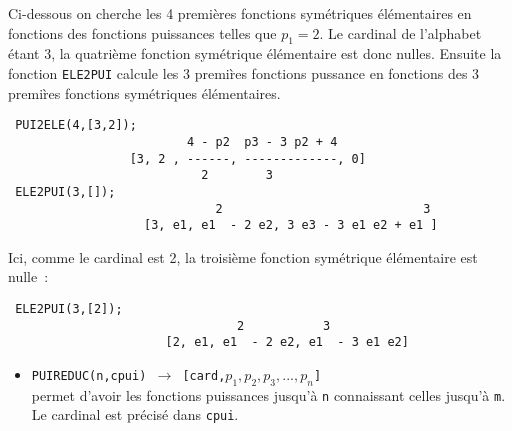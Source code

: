 \documentclass[11pt]{article}
\begin{document}
Ci-dessous on cherche les 4 premi\`eres fonctions sym\'etriques 
\'el\'ementaires en fonctions des fonctions puissances telles
que $p_1=2$. Le cardinal
de l'alphabet \'etant 3, la quatri\`eme fonction sym\'etrique
\'el\'ementaire est donc nulles. Ensuite la fonction {\tt ELE2PUI}
calcule les 3 premi\`res fonctions pussance en fonctions des 3 premi\`res 
fonctions sym\'etriques \'el\'ementaires.
\small
\begin{verbatim}
 PUI2ELE(4,[3,2]);
                         4 - p2  p3 - 3 p2 + 4
                 [3, 2 , ------, -------------, 0]
                           2        3   
 ELE2PUI(3,[]);
                             2                            3
                   [3, e1, e1  - 2 e2, 3 e3 - 3 e1 e2 + e1 ]
\end{verbatim}
\normalsize
Ici, comme le cardinal est 2, la troisi\`{e}me fonction sym\'{e}trique
\'{e}l\'{e}mentaire est nulle~:
\small
\begin{verbatim}
 ELE2PUI(3,[2]);
                                2           3
                      [2, e1, e1  - 2 e2, e1  - 3 e1 e2]
\end{verbatim}
\normalsize
\begin{itemize}
\item {\tt PUIREDUC(n,cpui) 
$\longrightarrow$ [card,$p_{1},p_{2},p_{3},...,p_{n}$]}\\ 
permet d'avoir 
les fonctions puissances jusqu'\`{a} {\tt n} connaissant celles jusqu'\`{a} 
{\tt m}. Le cardinal est pr\'{e}cis\'{e} dans {\tt cpui}.
\end{itemize}
\end{document}
